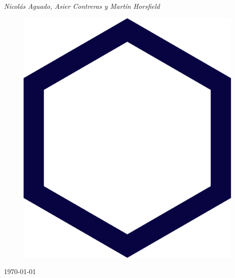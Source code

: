\documentclass[12pt,epsf,titlepage,a4paper]{article}
\begin{document}
\begin{titlepage}
\begin{minipage}{0.8\textwidth}
\begin{center} 
\large \emph{Nicolás Aguado, Asier Contreras y Martín Horsfield} \\[0.8cm]
\hspace{2cm}
\end{center}

\end{minipage}



\begin{figure}[h]
\centerline{\includegraphics[scale=0.15]{img/hexa.png}}
\label{logo}
\end{figure}

\begin{center}
\hspace{3cm}

\today
\end{center}

\end{titlepage}

\pagebreak

\tableofcontents
\vfill{}
\end{document}
